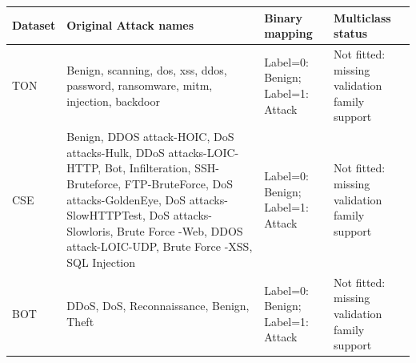 \begin{tabular}{p{}p{}p{}p{}}
\toprule
Dataset & Original Attack names & Binary mapping & Multiclass status \\
\midrule
TON & Benign, scanning, dos, xss, ddos, password, ransomware, mitm, injection, backdoor & Label=0: Benign; Label=1: Attack & Not fitted: missing validation family support \\
CSE & Benign, DDOS attack-HOIC, DoS attacks-Hulk, DDoS attacks-LOIC-HTTP, Bot, Infilteration, SSH-Bruteforce, FTP-BruteForce, DoS attacks-GoldenEye, DoS attacks-SlowHTTPTest, DoS attacks-Slowloris, Brute Force -Web, DDOS attack-LOIC-UDP, Brute Force -XSS, SQL Injection & Label=0: Benign; Label=1: Attack & Not fitted: missing validation family support \\
BOT & DDoS, DoS, Reconnaissance, Benign, Theft & Label=0: Benign; Label=1: Attack & Not fitted: missing validation family support \\
\bottomrule
\end{tabular}
